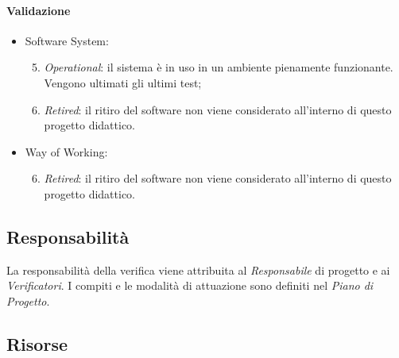 	\paragraph{Validazione}	
		\begin{itemize}
    		\item Software System:
    			\begin{enumerate}
    			\setcounter{enumi}{4}
    				\item \emph{Operational}: il sistema è in uso in un ambiente pienamente funzionante. Vengono ultimati gli ultimi test;
    				\item \emph{Retired}: il ritiro del software non viene considerato all'interno di questo progetto didattico.
    			\end{enumerate}
    		\item Way of Working:
    			\begin{enumerate}
    			\setcounter{enumi}{5}
    				\item \emph{Retired}: il ritiro del software non viene considerato all'interno di questo progetto didattico.
    			\end{enumerate}
    	\end{itemize}
	
		
	\subsection{Responsabilità}

	La responsabilità della verifica viene attribuita al \emph{Responsabile} di progetto e ai \emph{Verificatori}. I compiti e le modalità di attuazione sono definiti nel \emph{Piano di Progetto}.
	
	\subsection{Risorse}

